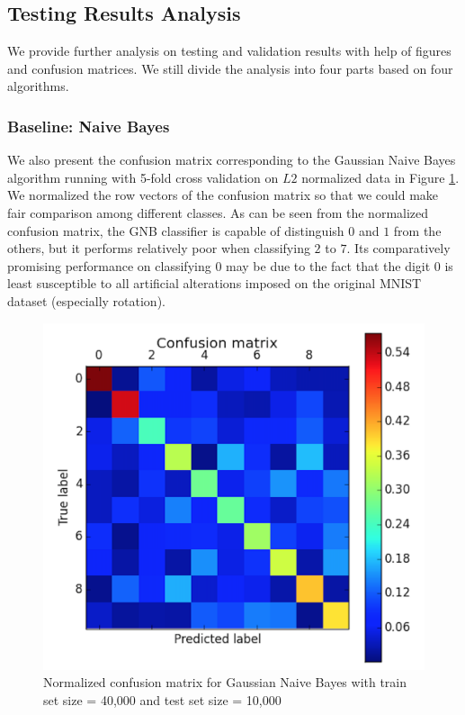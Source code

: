 \documentclass{acm_proc_article-sp}
\begin{document}
\subsection{Testing Results Analysis}
We provide further analysis on testing and validation results with help of figures and confusion matrices. We still divide the analysis into four parts based on four algorithms.

\subsubsection{Baseline: Naive Bayes}
We also present the confusion matrix corresponding to the Gaussian Naive Bayes algorithm running with 5-fold cross validation on $L2$ normalized data in Figure \ref{fig:gnb_cm}. We normalized the row vectors of the confusion matrix so that we could make fair comparison among different classes. As can be seen from the normalized confusion matrix, the GNB classifier is capable of distinguish $0$ and $1$ from the others, but it performs relatively poor when classifying $2$ to $7$. Its comparatively promising performance on classifying $0$ may be due to the fact that the digit $0$ is least susceptible to all artificial alterations imposed on the original MNIST dataset (especially rotation).
\begin{figure} 
\centering
\includegraphics[width=0.9\columnwidth]{graphs/gnb_cm1.png}  
\caption{Normalized confusion matrix for Gaussian Naive Bayes with train set size = 40,000 and test set size = 10,000}
\label{fig:gnb_cm}
\end{figure}
\end{document}
